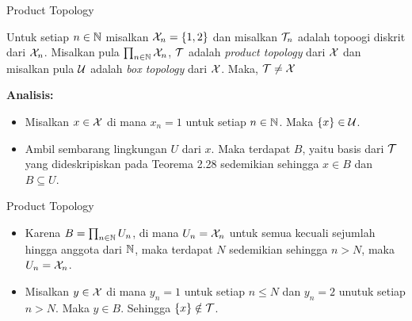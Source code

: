     \begin{frame}{Product Topology}
        \begin{tcolorbox}[enhanced,title=Contoh,frame style tile={width=\paperwidth}{wallpaper}]
            Untuk setiap $n\in\mathbb{N}$ misalkan $\mathcal{X}_n = \{1,2\}$ dan misalkan $\mathcal{T}_n$ adalah topoogi diskrit dari $\mathcal{X}_n$. Misalkan pula $\prod_{n\in\mathbb{N}}\mathcal{X}_n$, $\mathcal{T}$ adalah \textit{product topology} dari $\mathcal{X}$ dan misalkan pula $\mathcal{U}$ adalah \textit{box topology} dari $\mathcal{X}$. Maka, $\mathcal{T}\neq\mathcal{X}$
        \end{tcolorbox}
        \textbf{Analisis:}\\
        \begin{itemize}
            \item Misalkan $x\in\mathcal{X}$ di mana $x_n = 1$ untuk setiap $n\in\mathbb{N}$. Maka $\{x\}\in\mathcal{U}$.
            \item Ambil sembarang lingkungan $U$ dari $x$. Maka terdapat $B$, yaitu basis dari $\mathcal{T}$ yang dideskripiskan pada Teorema 2.28 sedemikian sehingga $x\in B$ dan $B\subseteq U$.
        \end{itemize} 
    \end{frame}
    
    \begin{frame}{Product Topology}
        \begin{itemize}
            \item Karena $B = \prod_{n\in\mathbb{N}} U_n$, di mana $U_n=\mathcal{X}_n$ untuk semua kecuali sejumlah hingga anggota dari $\mathbb{N}$, maka terdapat $N$ sedemikian sehingga $n>N$, maka $U_n = \mathcal{X}_n$.
            \item Misalkan $y\in\mathcal{X}$ di mana $y_n = 1$ untuk setiap $n\leq N$ dan $y_n = 2$ unutuk setiap $n>N$. Maka $y\in B$. Sehingga $\{x\} \notin \mathcal{T}$.
        \end{itemize}
    \end{frame}